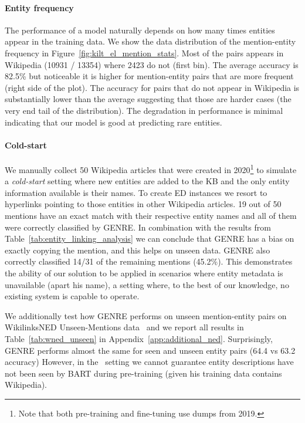 \documentclass{article} \usepackage{main,times}
\makeatletter
\def\genre{\textsc{GENRE}\@\xspace}
\makeatother
\begin{document}
\paragraph{Entity frequency}
The performance of a model naturally depends on how many times entities appear in the training data. We show the data distribution of the mention-entity frequency in Figure~\ref{fig:kilt_el_mention_stats}. Most of the pairs appears in Wikipedia (10931 / 13354) where 2423 do not (first bin). The average accuracy is 82.5\% but noticeable it is higher for mention-entity pairs that are more frequent (right side of the plot). The accuracy for pairs that do not appear in Wikipedia is substantially lower than the average suggesting that those are harder cases (the very end tail of the distribution). The degradation in performance is minimal indicating that our model is good at predicting rare entities.

\paragraph{Cold-start}
We manually collect 50 Wikipedia articles that were created in 2020\footnote{Note that both pre-training and fine-tuning use dumps from 2019.}
to simulate a \textit{cold-start} setting where new entities are added to the KB and the only entity information available is their names. 
To create ED instances we resort to hyperlinks pointing to those entities in other Wikipedia articles.
19 out of 50 mentions have an exact match with their respective entity names and all of them were correctly classified by \genre. In combination with the results from Table~\ref{tab:entity_linking_analysis} we can conclude that \genre has a bias on exactly copying the mention, and this helps on unseen data.
\genre also correctly classified 14/31 of the remaining mentions (45.2\%). This demonstrates the ability of our solution to be applied in scenarios where entity metadata is unavailable (apart his name), a setting where, to the best of our knowledge, no existing system is capable to operate. 


We additionally test how \genre performs on unseen  mention-entity pairs on WikilinksNED Unseen-Mentions data~\citep{onoe2020fine} and we report all results in Table~\ref{tab:wned_unseen} in Appendix~\ref{app:additional_ned}.
Surprisingly, \genre performs almost the same for seen and unseen entity pairs  (64.4 vs 63.2 accuracy)
However, in the~\citet{onoe2020fine} setting we cannot guarantee entity descriptions have not been seen by BART during pre-training (given his training data contains Wikipedia). 
\end{document}
